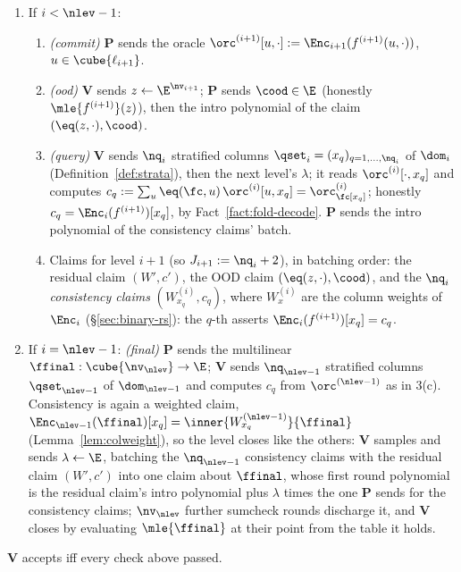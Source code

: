 \begin{protocol}
\begin{enumerate}[itemsep=0.5pt,topsep=2pt]
\item If $i < \nlev - 1$:
\begin{enumerate}[itemsep=0.5pt,topsep=1pt,label=(\alph*)]
\item \emph{(commit)} $\mathbf{P}$ sends the oracle $\orc^{(i+1)}[u, \cdot] := \Enc_{i+1}(f^{(i+1)}(u, \cdot))$, $u \in \cube{\ell_{i+1}}$.
\item \emph{(ood)} $\mathbf{V}$ sends $z \leftarrow \E^{\nv_{i+1}}$; $\mathbf{P}$ sends $\cood \in \E$ (honestly $\mle{f^{(i+1)}}(z)$), then the intro polynomial of the claim $(\eq(z, \cdot), \cood)$.
\item \emph{(query)} $\mathbf{V}$ sends $\nq_i$ stratified columns $\qset_i = (x_q)_{q = 1, \dots, \nq_i}$ of $\dom_i$ (Definition~\ref{def:strata}), then the next level's $\lambda$; it reads $\orc^{(i)}[\cdot, x_q]$ and computes $c_q := \sum_{u} \eq(\fc, u)\, \orc^{(i)}[u, x_q] = \orc^{(i)}_\fc[x_q]$; honestly $c_q = \Enc_i(f^{(i+1)})[x_q]$, by Fact~\ref{fact:fold-decode}. $\mathbf{P}$ sends the intro polynomial of the consistency claims' batch.
\item Claims for level $i+1$ (so $J_{i+1} := \nq_i + 2$), in batching order: the residual claim $(W', c')$, the OOD claim $(\eq(z, \cdot), \cood)$, and the $\nq_i$ \emph{consistency claims} $(W^{(i)}_{x_q}, c_q)$, where $W^{(i)}_x$ are the column weights of $\Enc_i$ (\S\ref{sec:binary-rs}): the $q$-th asserts $\Enc_i(f^{(i+1)})[x_q] = c_q$.
\end{enumerate}
\item If $i = \nlev - 1$: \emph{(final)} $\mathbf{P}$ sends the multilinear $\ffinal : \cube{\nv_\nlev} \to \E$; $\mathbf{V}$ sends $\nq_{\nlev-1}$ stratified columns $\qset_{\nlev-1}$ of $\dom_{\nlev-1}$ and computes $c_q$ from $\orc^{(\nlev-1)}$ as in 3(c). Consistency is again a weighted claim, $\Enc_{\nlev-1}(\ffinal)[x_q] = \inner{W^{(\nlev-1)}_{x_q}}{\ffinal}$ (Lemma~\ref{lem:colweight}), so the level closes like the others: $\mathbf{V}$ samples and sends $\lambda \leftarrow \E$, batching the $\nq_{\nlev-1}$ consistency claims with the residual claim $(W', c')$ into one claim about $\ffinal$, whose first round polynomial is the residual claim's intro polynomial plus $\lambda$ times the one $\mathbf{P}$ sends for the consistency claims; $\nv_\nlev$ further sumcheck rounds discharge it, and $\mathbf{V}$ closes by evaluating $\mle{\ffinal}$ at their point from the table it holds.
\end{enumerate}
$\mathbf{V}$ accepts iff every check above passed.
\end{protocol}

